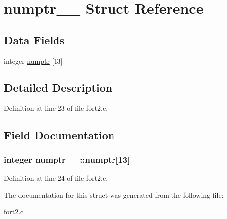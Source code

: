 \hypertarget{structnumptr__1__}{}\section{numptr\+\_\+\_\+ Struct Reference}
\label{structnumptr__1__}
\subsection*{Data Fields}
\begin{DoxyCompactItemize}
\item 
integer \hyperlink{structnumptr__1___af85799874fd740e876ed448355f995cd}{numptr} \mbox{[}13\mbox{]}
\end{DoxyCompactItemize}


\subsection{Detailed Description}


Definition at line 23 of file fort2.\+c.



\subsection{Field Documentation}
\subsubsection[{\texorpdfstring{numptr}{numptr}}]{\setlength{\rightskip}{0pt plus 5cm}integer numptr\+\_\+\_\+\+::numptr\mbox{[}13\mbox{]}}\hypertarget{structnumptr__1___af85799874fd740e876ed448355f995cd}{}\label{structnumptr__1___af85799874fd740e876ed448355f995cd}


Definition at line 24 of file fort2.\+c.



The documentation for this struct was generated from the following file\+:\begin{DoxyCompactItemize}
\item 
\hyperlink{fort2_8c}{fort2.\+c}\end{DoxyCompactItemize}
